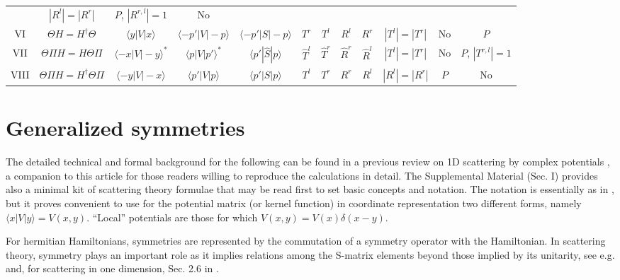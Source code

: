 \begin{table}
{\begin{tabular}{cccccccccccc}
&$|R^l|=|R^r|$&$P$, $|R^{r,l}|=1$&No
\\
VI & $\Theta H=H^\dagger\Theta$ &  $\langle y|V|x\rangle$& $\langle -p'|V|-p\rangle$ & $\langle -p'|S|-p\rangle$ & $T^r$& $T^l$ & $R^l$& $R^r$&$|T^l| = |T^r|$&No&$P$
\\
VII & $\Theta\Pi H=H\Theta \Pi$ &  $\langle -x|V|-y\rangle^*$ & $\langle p|V|p'\rangle^*$ & $\langle p'|\widehat{S}|p\rangle$ &$\widehat{T}^l$& $\widehat{T}^r$ & $\widehat{R}^r$& $\widehat{R}^l$&$|T^l|=|T^r|$&No&$P$, $|T^{r,l}|=1$
\\
VIII& $\Theta\Pi H=H^\dagger \Theta \Pi$ &  $\langle -y|V|-x\rangle$ & $\langle p'|V|p\rangle$ & $\langle p'|S|p\rangle$ & $T^l$ & $T^r$ & $R^r$ & $R^l$&$|R^l|=|R^r|$&$P$&No
\end{tabular}
}

\end{table}




\section{Generalized symmetries}


The detailed technical and formal background for the following can be found in
a previous review on 1D scattering by complex potentials \cite{Muga2004}, a companion to this article
for those readers willing to reproduce the calculations in detail.
The Supplemental Material (Sec. I)  provides also a minimal kit of scattering theory formulae that may be
read first to set basic concepts and notation.
The notation is essentially as in \cite{Muga2004}, but it proves convenient to use
for the potential matrix (or kernel function) in coordinate representation
two different forms, namely $\langle x|V|y\rangle=V(x,y)$. ``Local'' potentials are those
for which $V(x,y)=V(x)\delta(x-y)$.



%
For hermitian  Hamiltonians, symmetries are represented by the commutation of
a symmetry operator with the Hamiltonian.
In scattering theory, symmetry plays an important role  as it implies relations among
the S-matrix elements beyond those implied by its unitarity, see e.g. \cite{Taylor1972} and, for scattering in one dimension,
Sec. 2.6 in \cite{Muga2004}.


